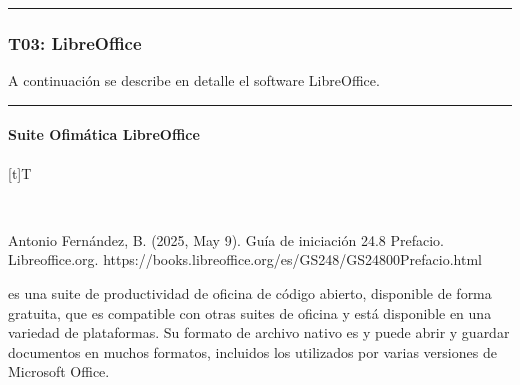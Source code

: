 \documentclass[letterpaper,10pt,spanish]{sphinxmanual}
\let\sphinxpxdimen\pdfpxdimen\else\newdimen\sphinxpxdimen
\begin{document}
\bigskip\hrule\bigskip


\sphinxstepscope


\subsubsection{T03: LibreOffice}
\label{\detokenize{cursos/ofimatica10/recursos/T03:t03-libreoffice}}\label{\detokenize{cursos/ofimatica10/recursos/T03::doc}}
\sphinxAtStartPar
A continuación se describe en detalle el software LibreOffice.


\bigskip\hrule\bigskip



\paragraph{Suite Ofimática LibreOffice}
\label{\detokenize{cursos/ofimatica10/recursos/T03:suite-ofimatica-libreoffice}}

\begin{savenotes}\sphinxattablestart
\sphinxthistablewithglobalstyle
\centering
\begin{tabulary}{\linewidth}[t]{T}
\sphinxtoprule
\sphinxtableatstartofbodyhook

\begin{sphinxfigure-in-table}
\centering
\capstart
\noindent\sphinxincludegraphics[width=300\sphinxpxdimen]{{image15}.png}
\label{\detokenize{cursos/ofimatica10/recursos/T03:id7}}\end{sphinxfigure-in-table}\relax
\\
\sphinxbottomrule
\end{tabulary}
\sphinxtableafterendhook\par
\sphinxattableend\end{savenotes}

\sphinxAtStartPar
%
\begin{footnote}[1]\sphinxAtStartFootnote
Antonio Fernández, B. (2025, May 9). Guía de iniciación 24.8 \sphinxhyphen{} Prefacio. Libreoffice.org. https://books.libreoffice.org/es/GS248/GS24800\sphinxhyphen{}Prefacio.html
%
\end{footnote}  es una suite de productividad de oficina de código abierto, disponible de forma gratuita, que es compatible con otras suites de oficina y está disponible en una variedad de plataformas. Su formato de archivo nativo es  y puede abrir y guardar documentos en muchos formatos, incluidos los utilizados por varias versiones de Microsoft Office.
\end{document}
